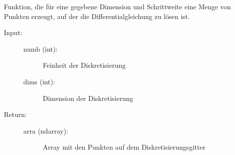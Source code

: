 \documentclass[letterpaper,10pt,ngerman, oneside, openright]{sphinxmanual}
\begin{document}
\begin{fulllineitems}
\label{\detokenize{index:aufg_3_2u3_main.gitter}}
Funktion, die für eine gegebene Dimension und Schrittweite eine Menge von Punkten erzeugt, auf
der die Differentialgleichung zu lösen ist.
\begin{description}
\item [{Input:}] \leavevmode

\begin{description}
\item[{numb (int):}] \leavevmode
Feinheit der Diskretisierung

\item[{dims (int):}] \leavevmode
Dimension der Diskretisierung

\end{description}
\end{description}
\begin{description}
\item[{Return:}] \leavevmode\begin{description}
\item[{arra (ndarray):}] \leavevmode
Array mit den Punkten auf dem Diskretisierungsgitter

\end{description}

\end{description}

\end{fulllineitems}

\end{document}
